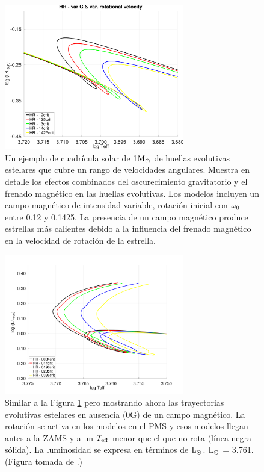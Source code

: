 \begin{figure}
	\centering
	\includegraphics[width=0.7\textwidth]{img/paper2/hr_var_vel_var_g_z13.pdf}
	\caption{Un ejemplo de cuadrícula solar de 1$\mathrm{M}_\odot$ de huellas evolutivas estelares que cubre un rango de velocidades angulares. Muestra en detalle los efectos combinados del oscurecimiento gravitatorio y el frenado magnético en las huellas evolutivas. Los modelos incluyen un campo magnético de intensidad variable, rotación inicial con $\omega_{\mathrm{0}}$ entre 0.12 y 0.1425. La presencia de un campo magnético produce estrellas más calientes debido a la influencia del frenado magnético en la velocidad de rotación de la estrella.}
	\label{fig:hr_var_vel_var_g_z13}
\end{figure}

\begin{figure}
	\centering
	\includegraphics[width=0.7\textwidth]{img/paper2/hr_var_vel_0_0g_z10.pdf}
	\caption{Similar a la Figura \ref{fig:hr_var_vel_var_g_z13} pero mostrando ahora las trayectorias evolutivas estelares en ausencia (0G) de un campo magnético. La rotación se activa en los modelos en el PMS y esos modelos llegan antes a la ZAMS y a un $T_{\mathrm{eff}}$ menor que el que no rota (línea negra sólida). La luminosidad se expresa en términos de $\mathrm{L}_\odot$. $\mathrm{L}_\odot$ = 3.761. (Figura tomada de \cite{Caballero2020}.)}
	\label{fig:hr_var_vel_0g}
\end{figure}

